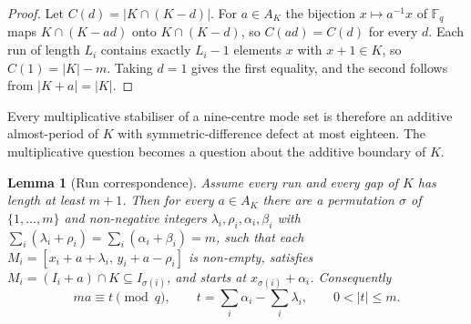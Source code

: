 \documentclass[11pt,a4paper]{article}
\newtheorem{lemma}[theorem]{Lemma}
\theoremstyle{definition}
\theoremstyle{remark}
\newcommand{\Fq}{\mathbb{F}_q}
\begin{document}
\begin{proof}
  Let $C(d)=|K\cap(K-d)|$.
  For $a\in A_K$ the bijection $x\mapsto a^{-1}x$ of $\Fq$ maps $K\cap(K-ad)$ onto
  $K\cap(K-d)$, so $C(ad)=C(d)$ for every $d$.
  Each run of length $L_i$ contains exactly $L_i-1$ elements $x$ with $x+1\in K$, so
  $C(1)=|K|-m$.
  Taking $d=1$ gives the first equality, and the second follows from $|K+a|=|K|$.
\end{proof}

Every multiplicative stabiliser of a nine-centre mode set is therefore an additive
almost-period of $K$ with symmetric-difference defect at most eighteen.
The multiplicative question becomes a question about the additive boundary of $K$.

\begin{lemma}[Run correspondence]
  \label{lem:run-correspondence}
  Assume every run and every gap of $K$ has length at least $m+1$.
  Then for every $a\in A_K$ there are a permutation $\sigma$ of $\{1,\ldots,m\}$ and
  non-negative integers $\lambda_i,\rho_i,\alpha_i,\beta_i$ with
  $\sum_i(\lambda_i+\rho_i)=\sum_i(\alpha_i+\beta_i)=m$, such that each
  $M_i=[x_i+a+\lambda_i,\,y_i+a-\rho_i]$ is non-empty, satisfies
  $M_i=(I_i+a)\cap K\subseteq I_{\sigma(i)}$, and starts at $x_{\sigma(i)}+\alpha_i$.
  Consequently
  \begin{equation}
    ma\equiv t\pmod q,
    \qquad
    t=\sum_i\alpha_i-\sum_i\lambda_i,
    \qquad
    0<|t|\leq m.
    \label{eq:residue-bound}
  \end{equation}
\end{lemma}
\end{document}
